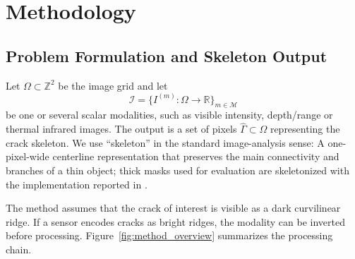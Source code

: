 \documentclass[conference,a4paper]{IEEEtran}
\begin{document}
\section{Methodology}

\subsection{Problem Formulation and Skeleton Output}
Let $\Omega\subset\mathbb Z^2$ be the image grid and let
\begin{equation}
    \mathcal I=\{I^{(m)}:\Omega\to\mathbb R\}_{m\in\mathcal M}
\end{equation}
be one or several scalar modalities, such as visible intensity, depth/range or thermal infrared images. The output is a set of pixels $\widehat\Gamma\subset\Omega$ representing the crack skeleton. We use ``skeleton'' in the standard image-analysis sense: A one-pixel-wide centerline representation that preserves the main connectivity and branches of a thin object; thick masks used for evaluation are skeletonized with the implementation reported in \cite{Lee1994, SciKitSkeletonization}.

The method assumes that the crack of interest is visible as a dark curvilinear ridge. If a sensor encodes cracks as bright ridges, the modality can be inverted before processing. 
Figure~\ref{fig:method_overview} summarizes the processing chain.
\end{document}
